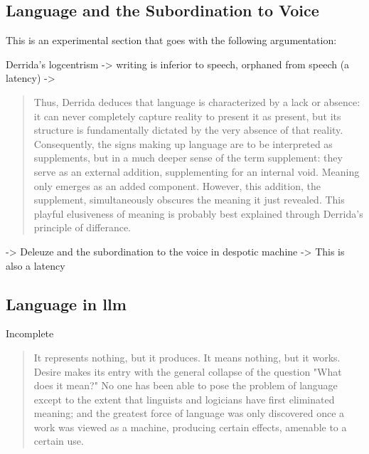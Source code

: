 \subsection{Language and the Subordination to Voice}

\begin{orangebox}
	This is an experimental section that goes with the following argumentation:

	Derrida's logcentrism -> writing is inferior to speech, orphaned from speech (a
	latency) ->

	\begin{quote}
		Thus, Derrida deduces that language is characterized by a lack or absence: it can never completely capture reality to present it as present, but its structure is fundamentally dictated by the very absence of that reality. Consequently, the signs making up language are to be interpreted as supplements, but in a much deeper sense of the term supplement: they serve as an external addition, supplementing for an internal void. Meaning only emerges as an added component. However, this addition, the supplement, simultaneously obscures the meaning it just revealed. This playful elusiveness of meaning is probably best explained through Derrida’s principle of differance. \parencite[8]{maas2023}
	\end{quote}

	-> Deleuze and the subordination to the voice in despotic machine -> This is
	also a latency
\end{orangebox}



\subsection{Language in \Gls{llm} }
\begin{orangebox}
	Incomplete
\end{orangebox}




\begin{quote}
	It represents nothing, but it produces. It means nothing, but it works.
	Desire makes its entry with the general collapse of the question "What does
	it mean?" No one has been able to pose the problem of language except to the
	extent that linguists and logicians have first eliminated meaning; and the
	greatest force of language was only discovered once a work was viewed as a
	machine, producing certain effects, amenable to a certain use.
	\cite[109]{deleuze1983}
\end{quote}


